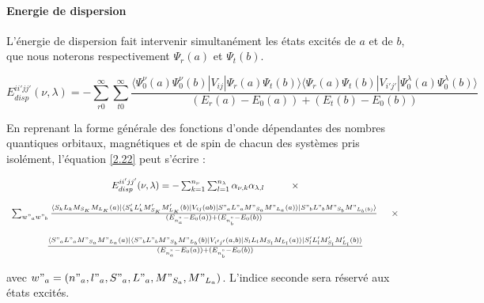 	
	\paragraph{Energie de dispersion}
	
	L'énergie de dispersion fait intervenir simultanément les états excités de $a$ et de $b$, que nous noterons respectivement $\Psi_{r}(a)$ et $\Psi_{t}(b)$.
	
	\begin{equation}
	E_{disp}^{ii'jj'} (\nu , \lambda) = - \sum_{r0}^{\infty} \sum_{t0}^{\infty} \frac{\langle \Psi_{0}^{\nu} (a) \Psi_{0}^{\nu} (b)| V_{ij}|\Psi_{r} (a) \Psi_{t} (b) \rangle  \langle \Psi_{r} (a) \Psi_{t} (b) |V_{i'j'}| \Psi_{0}^{\lambda} (a) \Psi_{0}^{\lambda}(b) \rangle}{(E_{r} (a) - E_{0} (a)) + (E_{t} (b) - E_{0} (b))} \label{2.22}
	\end{equation}
	
	En reprenant la forme générale des fonctions d'onde dépendantes des nombres quantiques orbitaux, magnétiques et de spin de chacun des systèmes pris isolément, l'équation \ref{2.22} peut s'écrire : 
	
	\begin{equation}
	\begin{array}{c}
	E_{disp}^{ii'jj'} (\nu , \lambda) = - \sum_{k=1}^{n_{\nu}} \sum_{l=1}^{n_{\lambda}} \alpha_{\nu , k} \alpha_{\lambda , l} \hspace{1cm} \times \\
	\\
	\sum_{w"_{a} w"_{b}} \frac{\langle S_{k} L_{k} M_{S_{K}} M_{L_{K}} (a) |\langle S'_{k} L'_{k} M'_{S_{K}} M'_{L_{K}} (b)| V_{ij} (ab) | S"_{a} L"_{a} M"_{S_{a}} M"_{L_{a}} (a)\rangle| S"_{b} L"_{b} M"_{S_{b}} M"_{L_{b}(b)} \rangle}{(E_{n_{a}^{"}} - E_{0}(a)) + (E_{n_{b}^{"}} - E_{0}(b))} \hspace{0.5 cm} \times \\
	\\
	\frac{\langle S"_{a} L"_{a} M"_{S_{a}} M"_{L_{a}} (a)| \langle S"_{b} L"_{b} M"_{S_{b}} M"_{L_{b}} (b) | V_{i'j'}(a,b)| S_{l} L_{l} M_{S_{l}} M_{L_{l}} (a) \rangle | S'_{l} L'_{l} M'_{S_{l}} M'_{L_{l}} (b) \rangle}{(E_{n_{a}^{"}} - E_{0} (a)) + (E_{n_{b}^{"}} - E_{0}(b))}
	\end{array}
	\end{equation}
	
	\noindent avec $w"_{a} = (n"_{a}, l"_{a}, S"_{a}, L"_{a}, M"_{S_{a}}, M"_{L_{a}})$. L'indice \og seconde \fg{} sera réservé aux états excités. 
	

